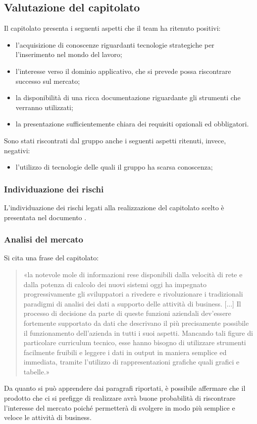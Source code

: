 	\subsection{Valutazione del capitolato} 
		Il capitolato presenta i seguenti aspetti che il team ha ritenuto positivi:
		\begin{itemize}
			\item l'acquisizione di conoscenze riguardanti tecnologie strategiche per l'inserimento nel mondo del lavoro;
			\item l'interesse verso il dominio applicativo, che si prevede possa riscontrare successo sul mercato;
			\item la disponibilità di una ricca documentazione riguardante gli strumenti che verranno utilizzati;
			\item la presentazione sufficientemente chiara dei requisiti opzionali ed obbligatori.
		\end{itemize}
		Sono stati riscontrati dal gruppo anche i seguenti aspetti ritenuti, invece, negativi:
		\begin{itemize}
			\item l'utilizzo di tecnologie delle quali il gruppo ha scarsa conoscenza;
		\end{itemize}
		\subsubsection{Individuazione dei rischi}
			L'individuazione dei rischi legati alla realizzazione del capitolato scelto è presentata nel documento
			.
		\subsubsection{Analisi del mercato}
			Si cita una frase del capitolato:
			\begin{quotation}
				«la notevole mole di informazioni rese disponibili dalla velocità di rete e dalla potenza di calcolo dei nuovi sistemi oggi ha impegnato progressivamente gli sviluppatori a rivedere e rivoluzionare i tradizionali paradigmi di analisi dei dati a supporto delle attività di business. [...]
				Il processo di decisione da parte di queste funzioni aziendali dev’essere fortemente supportato da dati che descrivano il più precisamente possibile il funzionamento dell’azienda in tutti i suoi aspetti. Mancando tali figure di particolare curriculum tecnico, esse hanno bisogno di utilizzare strumenti facilmente fruibili e leggere i dati in output in maniera semplice ed immediata, tramite l’utilizzo di rappresentazioni grafiche quali grafici e tabelle.»
			\end{quotation}
			Da quanto si può apprendere dai paragrafi riportati, è possibile affermare che il prodotto che ci si prefigge di realizzare avrà buone probabilità di riscontrare l'interesse del mercato poiché permetterà di svolgere in modo più semplice e veloce le attività di business.
